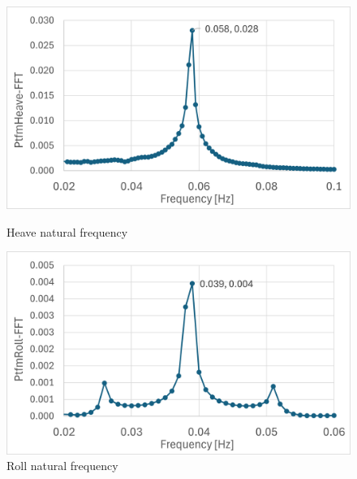 \documentclass[a4paper]{article}
\begin{document}
\begin{figure}[H]
    \begin{minipage}{0.49\textwidth}
        \centering
        \includegraphics[width=1\textwidth]{nat_freq_heave.png}
        \caption{\small Heave natural frequency}
        \label{fig:nat_freq_heave}
    \end{minipage}
    \hfill
    \begin{minipage}{0.5\textwidth}
        \centering
        \includegraphics[width=1\textwidth]{nat_freq_roll.png}
        \caption{\small Roll natural frequency}
        \label{fig:nat_freq_roll}
    \end{minipage}
\end{figure}
\end{document}
